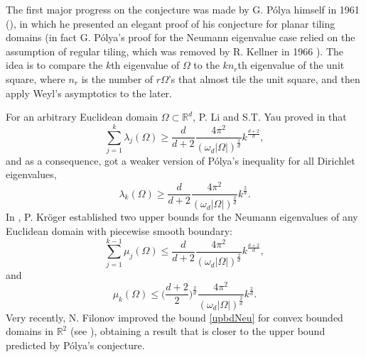 \documentclass[11pt,letterpaper]{amsart}
\numberwithin{equation}{section}
\theoremstyle{plain}
\theoremstyle{plain}
\numberwithin{equation}{section}
\theoremstyle{remark}
\begin{document}
	The first major progress on the conjecture was made by G. P\'olya himself in 1961 (\cite{P61}),  in which he presented an elegant proof of his conjecture for planar tiling domains (in fact G. P\'olya's proof for the Neumann eigenvalue case relied on the assumption of regular tiling, which was removed by R. Kellner in 1966 \cite{K66}). The idea is to compare the $k$th eigenvalue of $\Omega$ to the $kn_r$th eigenvalue of the unit square, where $n_r$ is the number of $r\Omega$'s that almost tile the unit square, and then apply Weyl's asymptotics to the later. %
	
	
	For an arbitrary Euclidean domain $\Omega \subset \mathbb R^d$, 
	P. Li and S.T. Yau proved in \cite{LY} that %
	\begin{equation}
		\label{LYineq}
		\sum_{j=1}^k\lambda_j(\Omega) \ge \frac d{d+2}\frac{4\pi^2}{(\omega_d |\Omega|)^{\frac 2d}} k^{\frac {d+2}d}, 
	\end{equation}
	and as a consequence, got a weaker version of P\'olya's inequality for all Dirichlet eigenvalues, 
	\begin{equation}
		\label{LYineq2} \lambda_k(\Omega) \ge \frac{d}{d+2}\frac{4\pi^2}{(\omega_d |\Omega|)^{\frac 2d}} k^{\frac 2d}.	
	\end{equation}
	{In \cite{Kr92}, P. Kr\"oger established two upper bounds for the Neumann eigenvalues of any Euclidean domain with piecewise smooth boundary:
	\[
	\sum_{j=1}^{k-1}\mu_j(\Omega)\le \frac d{d+2}\frac{4\pi^2}{(\omega_d |\Omega|)^{\frac 2d}} k^{\frac {d+2}d},
	\] 
	and
	\begin{equation}\label{upbdNeu}
		\mu_k(\Omega)\le \bigg(\frac{d+2}{2}\bigg)^{\frac 2d} \frac{4\pi^2}{(\omega_d |\Omega|)^{\frac 2d}} k^{\frac 2d}.	
	\end{equation}
	Very recently, N. Filonov improved the bound \eqref{upbdNeu} for convex bounded domains in $\mathbb{R}^2$ (see \cite{Fil02}), obtaining a result that is closer to the upper bound predicted by Pólya’s conjecture.}
	
\end{document}
